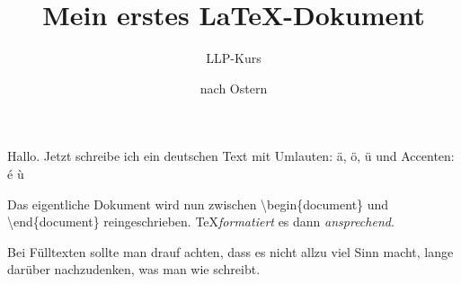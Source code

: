 \documentclass{scrartcl}
\title{Mein erstes \LaTeX-Dokument}
\author{LLP-Kurs}
\date{nach Ostern}
\begin{document}
\maketitle
  Hallo. Jetzt schreibe ich ein deutschen Text mit Umlauten: ä, ö, ü und Accenten: é ù %

  Das eigentliche Dokument wird nun zwischen
  \textbackslash begin\{document\} und \textbackslash end\{document\}
  reingeschrieben. \TeX \emph{formatiert}
  es dann \emph{ansprechend}.

  Bei Fülltexten sollte man drauf achten, dass es nicht
  allzu viel Sinn macht, lange darüber nachzudenken, was
  man wie schreibt.
\end{document}
